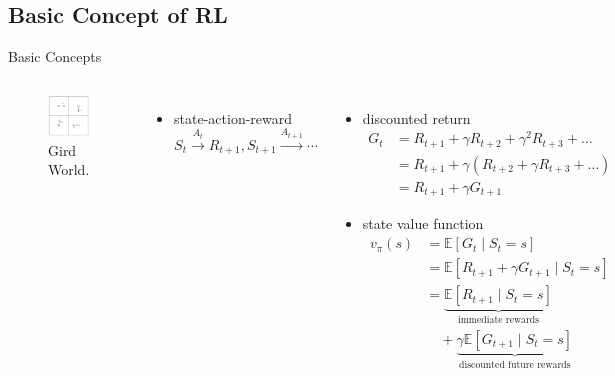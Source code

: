 \documentclass[UTF8, 10pt]{beamer}
\begin{document}
\begin{CJK*}{UTF8}{gbsn}
\section{Basic Concept of RL}
\begin{frame}{Basic Concepts}
	\begin{columns}
	\begin{figure}[htpb]
  		\begin{center}
    	\includegraphics[width=0.8 \linewidth]
    	{pic/grid.png}
    	\caption{Gird World.}
  		\end{center}
	\end{figure}
	\vspace{-0.5cm}
	\begin{itemize}
		\item state-action-reward
		\vspace{-0.2cm}
		$$S_{t} \xrightarrow{A_{t}} R_{t+1}, S_{t+1} \xrightarrow{A_{t+1}} \cdots$$
	\end{itemize}	
	\begin{itemize}
		\item discounted return
			$$\begin{aligned} G_{t} & =R_{t+1}+\gamma R_{t+2}+\gamma^{2} R_{t+3}+\ldots \\ & =R_{t+1}+\gamma\left(R_{t+2}+\gamma R_{t+3}+\ldots\right) \\ & =R_{t+1}+\gamma G_{t+1}\end{aligned}$$
		\item state value function
			$$\begin{aligned} v_{\pi}(s) & =\mathbb{E}\left[G_{t} \mid S_{t}=s\right] \\ & =\mathbb{E}\left[R_{t+1}+\gamma G_{t+1} \mid S_{t}=s\right] \\ & =\underbrace{\mathbb{E}\left[R_{t+1} \mid S_{t}=s\right]}_{\text{immediate rewards}}\\&\quad+\underbrace{\gamma \mathbb{E}\left[G_{t+1} \mid S_{t}=s\right]}_{\text{discounted future rewards}}\end{aligned}$$

\end{itemize}
\end{columns}
\end{frame}
\end{CJK*}
\end{document}
